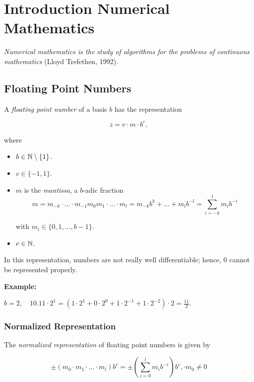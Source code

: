 \chapter{Introduction Numerical Mathematics}

\emph{Numerical mathematics is the study of algorithms for the problems of continuous mathematics} (Lloyd Trefethen, 1992).

\section{Floating Point Numbers}

A \emph{floating point number} of a basis \(b\) has the representation

\[
    z = v \cdot m \cdot b^c,
\]

where 

\begin{itemize} 

    \item \(b \in \mathbb{N} \setminus \{1\}\). 

    \item \(v \in \{-1, 1\}\). 

    \item \(m\) is the \emph{mantissa}, a \(b\)-adic fraction
    \[
        m = m_{-k} \cdot \dots \cdot m_{-1} m_0 m_{1} \cdot \dots \cdot m_{l} = m_{-k}b^k + \dots + m_l b^{-l} = \sum_{i = -k}^{l} m_i b^{-i}
    \]

    with \(m_i \in \{0, 1, \dots, b - 1\}\).

    \item \(e \in \mathbb{N}\).

\end{itemize}

In this representation, numbers are not really well differentiable; hence, 0 cannot be represented properly.

\textbf{Example:}

\(b = 2, \quad 10.11\cdot 2^1 = (1 \cdot 2^1 + 0 \cdot 2^0 + 1 \cdot 2^{-1} + 1 \cdot 2^{-2}) \cdot 2 = \frac{11}{2}\).

\subsection{Normalized Representation}

The \emph{normalized representation} of floating point numbers is given by 

\[
    \pm (m_0 \cdot m_1 \cdot \dots \cdot m_l)b^c = \pm \left(\sum_{i = 0}^{l} m_i b^{-i} \right)b^c, \cdot m_0 \ne 0
\]

